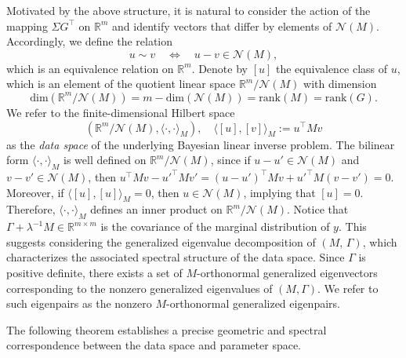 \documentclass[]{myarticle}
\begin{document}
Motivated by the above structure, it is natural to consider the action of the mapping $\Sigma G^\top$ on $\mathbb{R}^m$ and identify vectors that differ by elements of $\mathcal{N}(M)$. Accordingly, we define the relation
\[ u \sim v \quad \Longleftrightarrow \quad u-v \in \mathcal N(M), \]
which is an equivalence relation on $\mathbb R^m$. Denote by $[u]$ the equivalence class of $u$, which is an element of the quotient linear space $\mathbb R^m/\mathcal N(M)$ with dimension
\[\mathrm{dim}(\mathbb R^m/\mathcal N(M)) = m - \mathrm{dim}(\mathcal N(M)) 
= \mathrm{rank}(M) = \mathrm{rank}(G).\]
We refer to the finite-dimensional Hilbert space 
\begin{equation}\label{eq:quotient-inner}
  (\mathbb{R}^m / \mathcal{N}(M), \langle \cdot, \cdot \rangle_M), \quad
   \langle [u],[v]\rangle_M := u^\top M v
\end{equation}
as the \emph{data space} of the underlying Bayesian linear inverse problem. The bilinear form $\langle \cdot, \cdot\rangle_{M}$ is well defined on $\mathbb R^m/\mathcal N(M)$, since if $u-u'\in \mathcal N(M)$ and $v-v'\in \mathcal N(M)$, then $u^\top M v - {u'}^\top M v' =(u-u')^\top M v + {u'}^\top M (v-v') = 0$. Moreover, if $\langle [u],[u]\rangle_M=0$, then $u\in\mathcal{N}(M)$, implying that $[u]=0$. Therefore, $\langle \cdot, \cdot\rangle_{M}$ defines an inner product on $\mathbb R^m/\mathcal N(M)$. Notice that $\Gamma+\lambda^{-1}M\in\mathbb{R}^{m\times m}$ is the covariance of the marginal distribution of $y$. This suggests considering the generalized eigenvalue decomposition of $(M,\,\Gamma)$, which characterizes the associated spectral structure of the data space. Since $\Gamma$ is positive definite, there exists a set of $M$-orthonormal generalized eigenvectors corresponding to the nonzero generalized eigenvalues of $(M,\Gamma)$. We refer to such eigenpairs as the nonzero $M$-orthonormal generalized eigenpairs.

The following theorem establishes a precise geometric and spectral correspondence between the data space and parameter space. 
\end{document}
